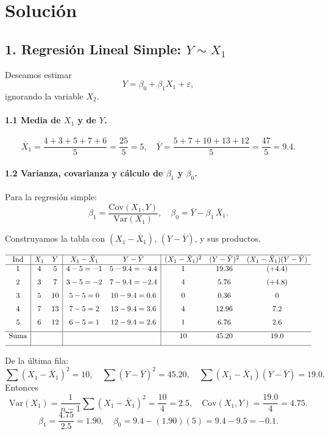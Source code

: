 \documentclass[10pt,a4paper]{article}
\begin{document}
\section*{Soluci\'on}

\subsection*{1. Regresi\'on Lineal Simple: $Y \sim X_1$}

Deseamos estimar 
\[
Y = \beta_0 + \beta_1 X_1 + \varepsilon,
\]
ignorando la variable $X_2$.

\paragraph{1.1 Media de $X_1$ y de $Y$.}

\[
\bar{X}_1
= \frac{4+3+5+7+6}{5}
= \frac{25}{5}
= 5,
\quad
\bar{Y}
= \frac{5+7+10+13+12}{5}
= \frac{47}{5}
= 9.4.
\]

\paragraph{1.2 Varianza, covarianza y c\'alculo de $\beta_1$ y $\beta_0$.}

Para la regresión simple:
\[
\beta_1
= \frac{\mathrm{Cov}(X_1,Y)}{\mathrm{Var}(X_1)},
\quad
\beta_0
= \bar{Y} - \beta_1\,\bar{X}_1.
\]

Construyamos la tabla con $(X_1-\bar{X}_1)$, $(Y-\bar{Y})$, y sus productos.

\[
\begin{array}{c|cc|cc|ccc}
\hline
\text{Ind} & X_1 & Y 
& X_1-\bar{X}_1 & Y-\bar{Y}
& (X_1 - \bar{X}_1)^2 & (Y - \bar{Y})^2
& (X_1-\bar{X}_1)(Y-\bar{Y})\\
\hline
1 & 4 & 5 
& 4-5=-1
& 5-9.4=-4.4
& 1
& 19.36
& (+4.4) \\[6pt]
2 & 3 & 7
& 3-5=-2
& 7-9.4=-2.4
& 4
& 5.76
& (+4.8) \\[6pt]
3 & 5 & 10
& 5-5=0
& 10-9.4=0.6
& 0
& 0.36
& 0 \\[6pt]
4 & 7 & 13
& 7-5=2
& 13-9.4=3.6
& 4
& 12.96
& 7.2 \\[6pt]
5 & 6 & 12
& 6-5=1
& 12-9.4=2.6
& 1
& 6.76
& 2.6 \\[6pt]
\hline
\text{Suma} & & & & 
& 10
& 45.20
& 19.0 \\[6pt]
\hline
\end{array}
\]

De la última fila:
\[
\sum (X_1-\bar{X}_1)^2 = 10,
\quad
\sum (Y - \bar{Y})^2 = 45.20,
\quad
\sum (X_1-\bar{X}_1)(Y-\bar{Y}) = 19.0.
\]
Entonces
\[
\mathrm{Var}(X_1)
= \frac{1}{n-1}\sum (X_1-\bar{X}_1)^2
= \frac{10}{4}
= 2.5,
\quad
\mathrm{Cov}(X_1,Y)
= \frac{19.0}{4}
= 4.75.
\]
\[
\beta_1
= \frac{4.75}{2.5}
= 1.90,
\quad
\beta_0
= 9.4 - (1.90)(5)
= 9.4 - 9.5
= -0.1.
\]
\end{document}
